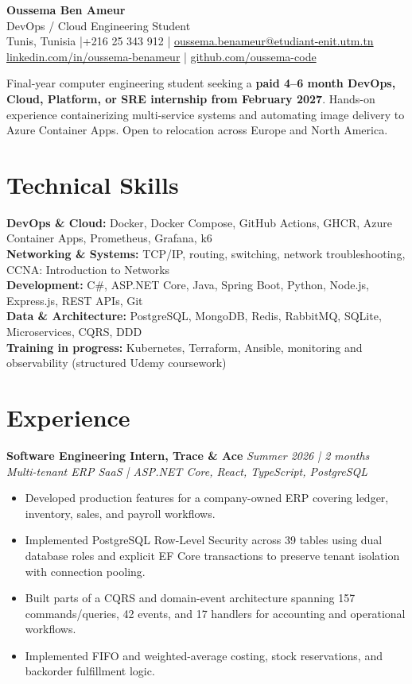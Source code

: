 \documentclass[10pt,a4paper]{article}
\begin{document}
\begin{center}
  {\LARGE\textbf{Oussema Ben Ameur}}\\[-1pt]
  {\normalsize DevOps / Cloud Engineering Student}\\[2pt]
  Tunis, Tunisia \enspace|\enspace +216 25 343 912 \enspace|\enspace
  \href{mailto:oussema.benameur@etudiant-enit.utm.tn}{oussema.benameur@etudiant-enit.utm.tn}\\[-1pt]
  \href{https://www.linkedin.com/in/oussema-benameur-07151b246/}{linkedin.com/in/oussema-benameur} \enspace|\enspace
  \href{https://github.com/oussema-code}{github.com/oussema-code}
\end{center}

\vspace{-4pt}
Final-year computer engineering student seeking a \textbf{paid 4--6 month DevOps, Cloud, Platform, or SRE internship from February 2027}. Hands-on experience containerizing multi-service systems and automating image delivery to Azure Container Apps. Open to relocation across Europe and North America.

\section{Technical Skills}
\textbf{DevOps \& Cloud:} Docker, Docker Compose, GitHub Actions, GHCR, Azure Container Apps, Prometheus, Grafana, k6\\
\textbf{Networking \& Systems:} TCP/IP, routing, switching, network troubleshooting, CCNA: Introduction to Networks\\
\textbf{Development:} C\#, ASP.NET Core, Java, Spring Boot, Python, Node.js, Express.js, REST APIs, Git\\
\textbf{Data \& Architecture:} PostgreSQL, MongoDB, Redis, RabbitMQ, SQLite, Microservices, CQRS, DDD\\
\textbf{Training in progress:} Kubernetes, Terraform, Ansible, monitoring and observability (structured Udemy coursework)

\section{Experience}
\textbf{Software Engineering Intern, Trace \& Ace} \hfill \textit{Summer 2026 | 2 months}\\
\textit{Multi-tenant ERP SaaS | ASP.NET Core, React, TypeScript, PostgreSQL}
\begin{itemize}
  \item Developed production features for a company-owned ERP covering ledger, inventory, sales, and payroll workflows.
  \item Implemented PostgreSQL Row-Level Security across 39 tables using dual database roles and explicit EF Core transactions to preserve tenant isolation with connection pooling.
  \item Built parts of a CQRS and domain-event architecture spanning 157 commands/queries, 42 events, and 17 handlers for accounting and operational workflows.
  \item Implemented FIFO and weighted-average costing, stock reservations, and backorder fulfillment logic.
\end{itemize}
\end{document}
